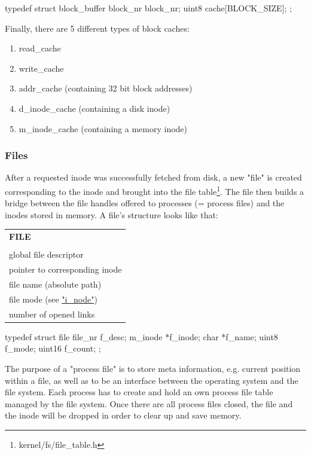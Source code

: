 \documentclass[11pt,a4paper]{scrartcl}
\begin{document}
\begin{code}
typedef struct block_buffer {
		block_nr block_nr;
		uint8 cache[BLOCK_SIZE];
};
\end{code}

Finally, there are 5 different types of block caches:
\begin{enumerate}
	\item{read\_cache}
	\item{write\_cache}
	\item{addr\_cache (containing 32 bit block addresses)}
	\item{d\_inode\_cache (containing a disk inode)}
	\item{m\_inode\_cache (containing a memory inode)}
\end{enumerate}

\subsubsection{Files}
\hypertarget{filetable}{}
After a requested inode was successfully fetched from disk, a new "file" is created corresponding to the inode and brought into the file table\footnote{kernel/fs/file\_table.h}. The file then builds a bridge between the file handles offered to processes (= process files) and the inodes stored in memory. A file's structure looks like that:

\vspace{0.3cm}
\begin{tabular}{|l|}
\hline
\textbf{FILE}\\\\\hline
global file descriptor\\\hline
pointer to corresponding inode\\\hline
file name (absolute path)\\\hline
file mode (see \hyperlink{inodetable}{"i\_node"})\\\hline
number of opened links\\\hline
\end{tabular}

\begin{code}
typedef struct file {
		file_nr f_desc;
		m_inode *f_inode;
		char *f_name;
		uint8 f_mode;
		uint16 f_count;
};
\end{code}

\hypertarget{processfiletable}{}
The purpose of a "process file" is to store meta information, e.g. current position within a file, as well as to be an interface between the operating system and the file system. Each process has to create and hold an own process file table managed by the file system. Once there are all process files closed, the file and the inode will be dropped in order to clear up and save memory.
\end{document}
